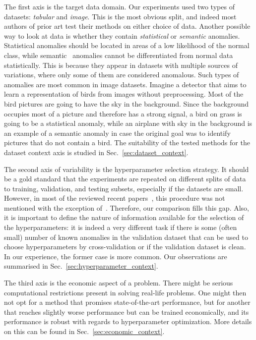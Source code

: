 The first axis is the target data domain. Our experiments used two types of datasets: \textit{tabular} and \textit{image}. This is the most obvious split, and indeed most authors of prior art test their methods on either choice of data. Another possible way to look at data is whether they contain \textit{statistical} or \textit{semantic} anomalies. Statistical anomalies should be located in areas of a low likelihood of the normal class, while semantic~\cite{ahmed2020detecting} anomalies cannot be differentiated from normal data statistically. This is because they appear in datasets with multiple sources of variations, where only some of them are considered anomalous. Such types of anomalies are most common in image datasets.  Imagine a detector that aims to learn a representation of birds from images without preprocessing. Most of the bird pictures are going to have the sky in the background. Since the background occupies most of a picture and therefore has a strong signal, a bird on grass is going to be a statistical anomaly, while an airplane with sky in the background is an example of a semantic anomaly in case the original goal was to identify pictures that do not contain a bird. The suitability of the tested methods for the dataset context axis is studied in Sec.~\ref{sec:dataset_context}.

The second axis of variability is the hyperparameter selection strategy. It should be a gold standard that the experiments are repeated on different splits of data to training, validation, and testing subsets, especially if the datasets are small. However, in most of the reviewed recent papers~\cite{liu2019generative,wang2020advae,schlegl2017unsupervised, akcay2018ganomaly, perera2019ocgan}, this procedure was not mentioned with the exception of~\cite{ruff2018deep}. Therefore, our comparison fills this gap. Also, it is important to define the nature of information available for the selection of the hyperparameters: it is indeed a very different task if there is some (often small) number of known anomalies in the validation dataset that can be used to choose hyperparameters by cross-validation or if the validation dataset is clean. In our experience, the former case is more common. Our observations are summarised in Sec.~\ref{sec:hyperparameter_context}.

The third axis is the economic aspect of a problem. There might be serious computational restrictions present in solving real-life problems. One might then not opt for a method that promises state-of-the-art performance, but for another that reaches slightly worse performance but can be trained economically, and its performance is robust with regards to hyperparameter optimization. More details on this can be found in Sec.~\ref{sec:economic_context}.

